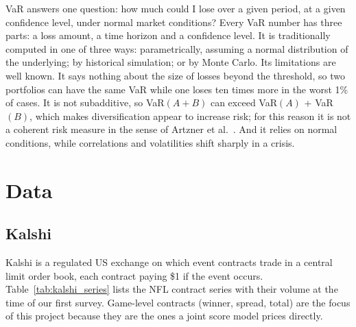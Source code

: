 \documentclass[11pt]{article}
\begin{document}
VaR answers one question: how much could I lose over a given period, at a given confidence level, under normal market conditions? Every VaR number has three parts: a loss amount, a time horizon and a confidence level. It is traditionally computed in one of three ways: parametrically, assuming a normal distribution of the underlying; by historical simulation; or by Monte Carlo. Its limitations are well known. It says nothing about the size of losses beyond the threshold, so two portfolios can have the same VaR while one loses ten times more in the worst 1\% of cases. It is not subadditive, so VaR$(A+B)$ can exceed VaR$(A)$ + VaR$(B)$, which makes diversification appear to increase risk; for this reason it is not a coherent risk measure in the sense of Artzner et al.~\cite{artzner1999}. And it relies on normal conditions, while correlations and volatilities shift sharply in a crisis.


\section{Data}\label{sec:data}

\subsection{Kalshi}

Kalshi is a regulated US exchange on which event contracts trade in a central limit order book, each contract paying \$1 if the event occurs. Table~\ref{tab:kalshi_series} lists the NFL contract series with their volume at the time of our first survey. Game-level contracts (winner, spread, total) are the focus of this project because they are the ones a joint score model prices directly.
\end{document}
